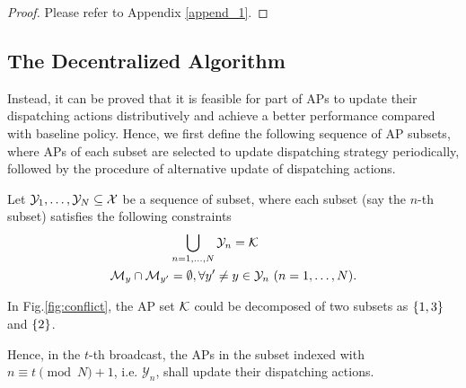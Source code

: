 \begin{proof}
    Please refer to Appendix \ref{append_1}.
\end{proof}

\subsection{The Decentralized Algorithm}
\label{subsec:ap_alg}
Instead, it can be proved that it is feasible for part of APs to update their dispatching actions distributively and achieve a better performance compared with baseline policy.
Hence, we first define the following sequence of AP subsets, where APs of each subset are selected to update dispatching strategy periodically, followed by the procedure of alternative update of dispatching actions.
\begin{definition}
    Let $\mathcal{Y}_{1}, \dots, \mathcal{Y}_{N} \subseteq \mathcal{X}$ be a sequence of subset, where each subset (say the $n$-th subset) satisfies the following constraints
    \begin{align}
        &\bigcup_{n=1,\dots,N} \mathcal{Y}_{n} = \mathcal{K}
        \\
        \mathcal{M}_{y} \cap \mathcal{M}_{y'} &=\emptyset, \forall y' \neq y \in \mathcal{Y}_{n}~(n=1,\dots,N).
    \end{align}
\end{definition}
\begin{example}
    In Fig.\ref{fig:conflict}, the AP set $\mathcal{K}$ could be decomposed of two subsets as $\{1,3\}$ and $\{2\}$.
\end{example}


Hence, in the $t$-th broadcast, the APs in the subset indexed with $n \equiv t \pmod{N} + 1$, i.e. $\mathcal{Y}_{n}$, shall update their dispatching actions.

